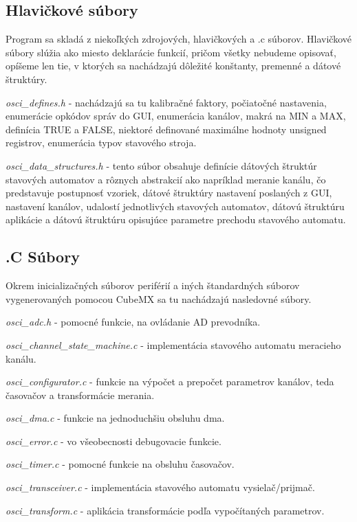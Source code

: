 \documentclass[main.tex]{subfiles}
\begin{document}
\begin{multicols*}{2}
			\subsection{Hlavičkové súbory}
			Program sa skladá z niekoľkých zdrojových, hlavičkových a  .c súborov. Hlavičkové súbory slúžia ako miesto deklarácie funkcií, pričom všetky nebudeme opisovať, opíšeme len tie, v ktorých sa nachádzajú dôležité konštanty, premenné a dátové štruktúry.
			
			\textit{osci\_defines.h } - nachádzajú sa tu kalibračné faktory, počiatočné nastavenia, enumerácie opkódov správ do GUI, enumerácia kanálov, makrá na MIN a MAX, definícia TRUE a FALSE, niektoré definované maximálne hodnoty unsigned registrov, enumerácia typov stavového stroja.
			
			\textit{osci\_data\_structures.h} - tento súbor obsahuje definície dátových štruktúr stavových automatov a rôznych abstrakcií ako napríklad meranie kanálu, čo predstavuje postupnosť vzoriek, dátové štruktúry nastavení poslaných z GUI, nastavení kanálov, udalostí jednotlivých stavových automatov, dátovú štruktúru aplikácie a dátovú štruktúru opisujúce parametre prechodu stavového automatu.
			\subsection{.C Súbory}
			Okrem inicializačných súborov periférií a iných štandardných súborov vygenerovaných pomocou CubeMX sa tu nachádzajú nasledovné súbory.
			
			\textit{ osci\_adc.h} - pomocné funkcie, na ovládanie AD prevodníka. 
			
			\textit{ osci\_channel\_state\_machine.c} - implementácia stavového automatu meracieho kanálu. 
			
			\textit{ osci\_configurator.c} -  funkcie na výpočet a prepočet parametrov kanálov, teda časovačov a transformácie merania. 
			
			\textit{ osci\_dma.c} - funkcie na jednoduchšiu obsluhu dma. 
			
			\textit{ osci\_error.c} - vo všeobecnosti debugovacie funkcie.
			
			\textit{ osci\_timer.c} - pomocné funkcie na obsluhu časovačov. 
			
			\textit{ osci\_transceiver.c} - implementácia stavového automatu vysielač/prijmač.
			
			\textit{ osci\_transform.c} - aplikácia transformácie podľa vypočítaných parametrov.
			

\end{multicols*}
\end{document}
